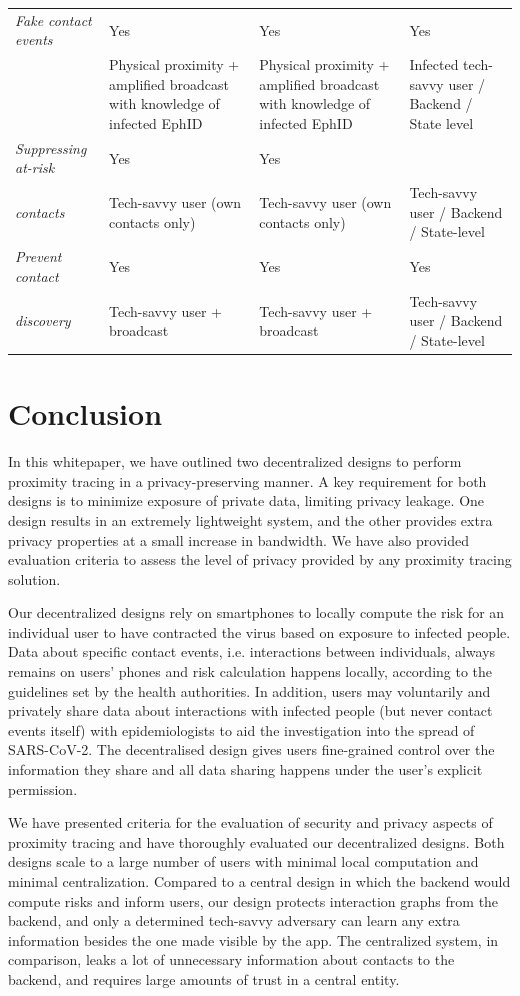 \documentclass[10.8pt,a4paper]{article}
\begin{document}
\begin{table}[H]
\begin{tabular}{p{4cm}p{5cm}p{5cm}p{5cm}}
\textit{Fake contact events} & Yes & Yes & Yes\\
 & \small Physical proximity + amplified broadcast with knowledge of infected EphID &  \small Physical proximity + amplified broadcast with knowledge of infected EphID & \small Infected tech-savvy user / Backend / State level\\
\textit{Suppressing at-risk} & Yes & Yes \\
\textit{contacts} & \small Tech-savvy user (own contacts only) & \small Tech-savvy user (own contacts only) &  Tech-savvy user / Backend / State-level\\
\textit{Prevent contact} & Yes & Yes & Yes \\
\textit{discovery} & \small Tech-savvy user + broadcast & \small Tech-savvy user + broadcast  & \small Tech-savvy user / Backend / State-level\\ \hline
\end{tabular}
\end{table}


\clearpage
\section{Conclusion}
In this whitepaper, we have outlined two decentralized designs to perform proximity tracing in a privacy-preserving manner. A key requirement for both designs is to minimize exposure of private data, limiting privacy leakage. One design results in an extremely lightweight system, and the other provides extra privacy properties at a small increase in bandwidth. We have also provided evaluation criteria to assess the level of privacy provided by any proximity tracing solution.

Our decentralized designs rely on smartphones to locally compute the risk for an individual user to have contracted the virus based on exposure to infected people. Data about specific contact events, i.e. interactions between individuals, always remains on users’ phones and risk calculation happens locally, according to the guidelines set by the health authorities. In addition, users may voluntarily and privately share data about interactions with infected people (but never contact events itself) with epidemiologists to aid the investigation into the spread of SARS-CoV-2. The decentralised design gives users fine-grained control over the information they share and all data sharing happens under the user’s explicit permission.

We have presented criteria for the evaluation of security and privacy aspects of proximity tracing and have thoroughly evaluated our decentralized designs. Both designs scale to a large number of users with minimal local computation and minimal centralization. Compared to a central design in which the backend would compute risks and inform users, our design protects interaction graphs from the backend, and only a determined tech-savvy adversary can learn any extra information besides the one made visible by the app. The centralized system, in comparison, leaks a lot of unnecessary information about contacts to the backend, and requires large amounts of trust in a central entity.
\end{document}
